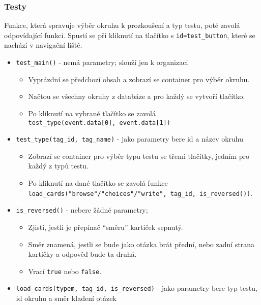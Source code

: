 \documentclass[11pt]{article}
\providecommand{\tightlist}{\setlength{\itemsep}{1pt}\setlength{\parskip}{1pt}}
\let\oldtexttt\texttt
\renewcommand{\texttt}[1]{\oldtexttt{\textcolor{codehighlight}{#1}}}
\begin{document}
\hypertarget{testy}{%
\subsubsection{Testy}\label{testy}}

Funkce, která spravuje výběr okruhu k prozkoušení a typ testu, poté
zavolá odpovídající funkci. Spustí se při kliknutí na tlačítko s
\texttt{id=test\_button}, které se nachází v navigační liště.

\begin{itemize}
\tightlist
\item
  \texttt{test\_main()} - nemá parametry; slouží jen k organizaci

  \begin{itemize}
  \tightlist
  \item
    Vyprázdní se předchozí obsah a zobrazí se container pro výběr
    okruhu.
  \item
    Načtou se všechny okruhy z databáze a pro každý se vytvoří tlačítko.
  \item
    Po kliknutí na vybrané tlačítko se zavolá
    \texttt{test\_type(event.data{[}0{]},\ event.data{[}1{]})}
  \end{itemize}
\item
  \texttt{test\_type(tag\_id,\ tag\_name)} - jako parametry bere id a
  název okruhu

  \begin{itemize}
  \tightlist
  \item
    Zobrazí se container pro výběr typu testu se třemi tlačítky, jedním
    pro každý z typů testu.
  \item
    Po kliknutí na dané tlačítko se zavolá funkce
    \texttt{load\_cards("browse"/"choices"/"write",\ tag\_id,\ is\_reversed())}.
  \end{itemize}
\item
  \texttt{is\_reversed()} - nebere žádné parametry;

  \begin{itemize}
  \tightlist
  \item
    Zjistí, jestli je přepínač ``směru'' kartiček sepnutý.
  \item
    Směr znamená, jestli se bude jako otázka brát přední, nebo zadní
    strana kartičky a odpověď bude ta druhá.
  \item
    Vrací \texttt{true} nebo \texttt{false}.
  \end{itemize}
\item
  \texttt{load\_cards(typem,\ tag\_id,\ is\_reversed)} - jako parametry
  bere typ testu, id okruhu a směr kladení otázek


\end{itemize}
\end{document}
